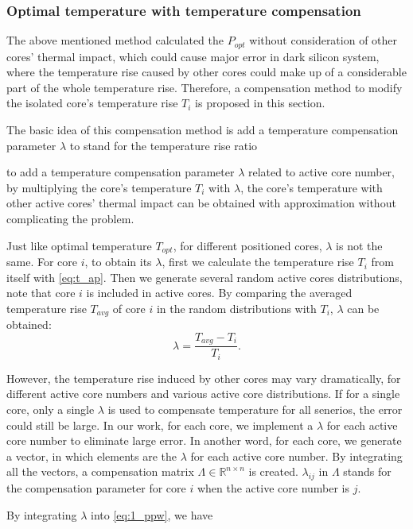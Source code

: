 \subsubsection{Optimal temperature with temperature compensation}
The above mentioned method calculated the $P_{opt}$ without consideration of other cores' thermal impact, which could cause major error in dark silicon system, where the temperature rise caused by other cores could make up of a considerable part of the whole temperature rise. Therefore, a compensation method to modify the isolated core's temperature rise $T_{i}$ is proposed in this section.

The basic idea of this compensation method is add a temperature compensation parameter $\lambda$ to stand for the temperature rise ratio 

to add a temperature compensation parameter $\lambda$ related to active core number, by multiplying the core's temperature $T_{i}$ with $\lambda$, the core's temperature with other active cores' thermal impact can be obtained with approximation without complicating the problem.

Just like optimal temperature $T_{opt}$, for different positioned cores, $\lambda$ is not the same. For core $i$, to obtain its $\lambda$, first we calculate the temperature rise $T_{i}$ from itself with \eqref{eq:t_ap}. Then we generate several random active cores distributions, note that core $i$ is included in active cores. By comparing the averaged temperature rise $T_{avg}$ of core $i$ in the random distributions with $T_{i}$, $\lambda$ can be obtained:
\begin{equation}\label{eq:lambda}
\lambda = \frac{T_{avg}-T_{i}}{T_{i}}.
\end{equation}

However, the temperature rise induced by other cores may vary dramatically, for different active core numbers and various active core distributions. If for a single core, only a single $\lambda$ is used to compensate temperature for all senerios, the error could still be large. In our work, for each core, we implement a $\lambda$ for each active core number to eliminate large error. In another word, for each core, we generate a vector, in which elements are the $\lambda$ for each active core number. By integrating all the vectors, a compensation matrix $\Lambda \in \mathbb{R}^{n \times n}$ is created. $\lambda_{ij}$ in $\Lambda$ stands for the compensation parameter for core $i$ when the active core number is $j$.

By integrating $\lambda$ into \eqref{eq:1_ppw}, we have

